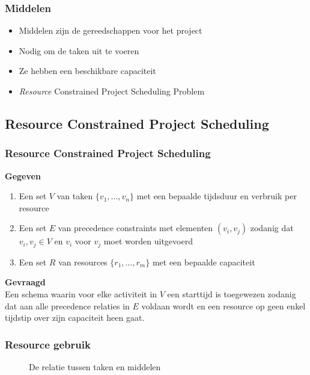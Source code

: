\documentclass{beamer}
\theoremstyle{definition}
\newcommand{\inputtikz}[1]{}
\begin{document}
\begin{frame}
	\frametitle{Middelen}
	\begin{itemize}
		\item Middelen zijn de gereedschappen voor het project
		\item Nodig om de taken uit te voeren
		\item Ze hebben een beschikbare capaciteit
		\item \emph{Resource} Constrained Project Scheduling Problem
	\end{itemize}
\end{frame}

\subsection{Resource Constrained Project Scheduling}
\begin{frame}
	\frametitle{Resource Constrained Project Scheduling}
	\textbf{Gegeven}
	\begin{enumerate}
		\item Een set $V$ van taken $\{v_1,\dots,v_n\}$ met een bepaalde tijdsduur en verbruik per resource
		\item Een set $E$ van precedence constraints met elementen $(v_i, v_j)$ zodanig dat $v_i, v_j \in V$ en $v_i$ voor $v_j$ moet worden uitgevoerd
		\item Een set $R$ van resources $\{r_1, \ldots, r_m\}$ met een bepaalde capaciteit
	\end{enumerate}
	
	\textbf{Gevraagd}\\
	Een schema waarin voor elke activiteit in $V$ een starttijd is toegewezen zodanig dat aan alle precedence relaties in $E$ voldaan wordt en een resource op geen enkel tijdstip over zijn capaciteit heen gaat.
\end{frame}

\begin{frame}
	\frametitle{Resource gebruik}
	\vspace{-.2em}
	\begin{figure}[ht]
		\makebox[\textwidth][c]{\resizebox{.7\paperwidth}{!}{
			\inputtikz{usage_nl}
		}}
		\vspace{-1em}
		\caption{De relatie tussen taken en middelen}
		\label{fig:activity_graph}
	\end{figure}
\end{frame}
\end{document}

